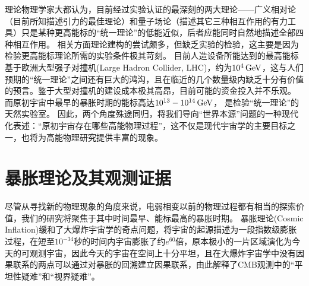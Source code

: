 理论物理学家大都认为，目前经过实验认证的最深刻的两大理论——广义相对论（目前所知描述引力的最佳理论）和量子场论（描述其它三种相互作用的有力工具）只是某种更高能标的“统一理论”的低能近似，后者应能同时自然地描述全部四种相互作用。
相关方面理论建构的尝试颇多，但缺乏实验的检验，这主要是因为检验更高能标理论所需的实验条件极其苛刻。
目前人造设备所能达到的最高能标基于欧洲大型强子对撞机(Large Hadron Collider, LHC)，约为$10^4\,{\rm GeV}$，这与人们预期的“统一理论”之间还有巨大的鸿沟，且在临近的几个数量级内缺乏十分有价值的预言。鉴于大型对撞机的建设成本极其高昂，目前可能的资金投入并不乐观。
而原初宇宙中最早的暴胀时期的能标高达$10^{13}-10^{14}\,{\rm GeV}$，%
是检验“统一理论”的天然实验室。
因此，两个角度殊途同归，将我们导向“世界本源”问题的一种现代化表述：“原初宇宙存在哪些高能物理过程”，这不仅是现代宇宙学的主要目标之一，也将为高能物理研究提供丰富的现象。

\section{暴胀理论及其观测证据}
尽管从寻找新的物理现象的角度来说，电弱相变以前的物理过程都有相当的探索价值，我们的研究将聚焦于其中时间最早、能标最高的暴胀时期。
暴胀理论(Cosmic Inflation)\cite{guth1981inflation}缓和了大爆炸宇宙学的奇点问题，将宇宙的起源描述为一段指数级膨胀过程，在短至$10^{-34}$秒的时间内宇宙膨胀了约$e^{60}$倍，原本极小的一片区域演化为今天的可观测宇宙，因此今天的宇宙在空间上十分平坦，且在大爆炸宇宙学中没有因果联系的两点可以通过对暴胀的回溯建立因果联系，由此解释了CMB观测中的“平坦性疑难”和“视界疑难”。

